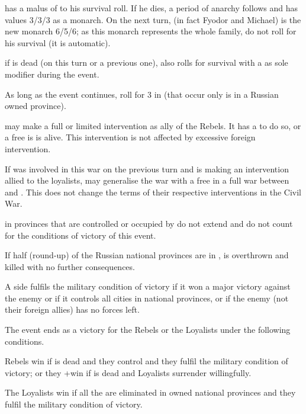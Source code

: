 \phevnt

\aparag {} has a malus of  to his survival
roll. If he dies, a period of anarchy follows and \RUS has values 3/3/3 as a
monarch. On the next turn, \monarqueRomanov (in fact Fyodor and Michael) is
the new monarch 6/5/6; as this monarch represents the whole family, do not
roll for his survival (it is automatic).

\aparag if  is dead (on this turn or a previous one),
\leaderDmitry also rolls for survival with a  as sole modifier
during the event.

\aparag As long as the event continues, roll for 3 \REVOLT in \RUS (that occur
only is in a Russian owned province).

\phdipl

\aparag \POL may make a full or limited intervention as ally of the Rebels. It
has a \CB to do so, or a free \CB is \leaderDmitry is alive. This
intervention is not affected by excessive foreign intervention.

\aparag If \POL was involved in this war on the previous turn and \SUE is
making an intervention allied to the loyalists, \POL may generalise the war
with a free \CB in a full war between \SUE and \POL. This does not change the
terms of their respective interventions in the Civil War.

\phpaix

\aparag \REVOLT in provinces that are controlled or occupied by \POL do not
extend and do not count for the conditions of victory of this event.

\aparag If half (round-up) of the Russian national provinces are in \REVOLT ,
 is overthrown and killed with no further
consequences.


\aparag A side fulfils the military condition of victory if it won a major
victory against the enemy or if it controls all cities in national provinces,
or if the enemy (not their foreign allies) has no forces left.

\aparag The event ends as a victory for the Rebels or the Loyalists under the
following conditions.

\bparag Rebels win if  is dead and they control
\villeMoscou and they fulfil the military condition of victory; or they +win
if  is dead and Loyalists surrender willingfully.

\bparag The Loyalists win if all the \REVOLT are eliminated in owned national
provinces and they fulfil the military condition of victory.

